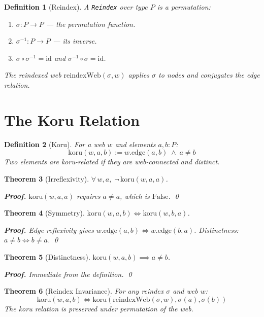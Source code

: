 \documentclass[12pt,a4paper]{article}
\newtheorem{theorem}{Theorem}[section]
\newtheorem{definition}[theorem]{Definition}
\begin{document}
\begin{definition}[Reindex]
A \texttt{Reindex} over type $P$ is a permutation:
\begin{enumerate}
    \item $\sigma : P \to P$ --- the permutation function.
    \item $\sigma^{-1} : P \to P$ --- its inverse.
    \item $\sigma \circ \sigma^{-1} = \text{id}$ and $\sigma^{-1} \circ \sigma = \text{id}$.
\end{enumerate}
The reindexed web $\text{reindexWeb}(\sigma, w)$ applies $\sigma$ to nodes
and conjugates the edge relation.
\end{definition}

\section{The Koru Relation}

\begin{definition}[Koru]
For a web $w$ and elements $a, b : P$:
\[
\text{koru}(w, a, b) := w.\text{edge}(a, b) \;\wedge\; a \neq b
\]
Two elements are koru-related if they are web-connected and distinct.
\end{definition}

\begin{theorem}[Irreflexivity]\label{thm:irrefl}
$\forall\, w, a,\; \neg\, \text{koru}(w, a, a)$.

\textbf{Proof.} $\text{koru}(w, a, a)$ requires $a \neq a$, which is
$\text{False}$. \qed
\end{theorem}

\begin{theorem}[Symmetry]\label{thm:symm}
$\text{koru}(w, a, b) \iff \text{koru}(w, b, a)$.

\textbf{Proof.} Edge reflexivity gives $w.\text{edge}(a, b) \iff w.\text{edge}(b, a)$.
Distinctness: $a \neq b \iff b \neq a$. \qed
\end{theorem}

\begin{theorem}[Distinctness]\label{thm:distinct}
$\text{koru}(w, a, b) \implies a \neq b$.

\textbf{Proof.} Immediate from the definition. \qed
\end{theorem}

\begin{theorem}[Reindex Invariance]\label{thm:reindex}
For any reindex $\sigma$ and web $w$:
\[
\text{koru}(w, a, b) \iff \text{koru}(\text{reindexWeb}(\sigma, w), \sigma(a), \sigma(b))
\]
The koru relation is preserved under permutation of the web.
\end{theorem}
\end{document}

